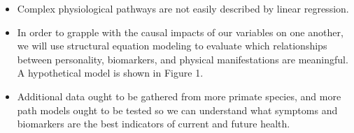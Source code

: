 \documentclass[a0,landscape]{a0poster}
\begin{document}
\begin{itemize}
\item Complex physiological pathways are not easily described by linear regression.
\item In order to grapple with the causal impacts of our variables on one another, we will use structural equation modeling to evaluate which relationships between personality, biomarkers, and physical manifestations are meaningful. A hypothetical model is shown in Figure 1.
\item Additional data ought to be gathered from more primate species, and more path models ought to be tested so we can understand what symptoms and biomarkers are the best indicators of current and future health.

\end{itemize}	





\color{Black}
{\footnotesize
\nocite{*} %

}

%
%
%



\end{document}

